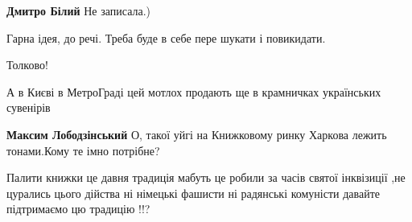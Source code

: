  
\textbf{Дмитро Білий} Не записала.)

 
Гарна ідея, до речі. Треба буде в себе пере шукати і повикидати.

 
Толково!

 
А в Києві в МетроГраді цей мотлох продають ще в крамничках українських сувенірів

 
\textbf{Максим Лободзінський} О, такої уйгі на Книжковому ринку Харкова лежить тонами.Кому те імно потрібне?

 

Палити книжки це давня традиція мабуть це робили за часів святої інквізиції ,не
цурались цього дійства ні німецькі фашисти ні радянські комуністи давайте
підтримаємо цю традицію !!?

 

